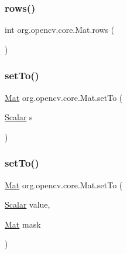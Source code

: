 \subsubsection{\texorpdfstring{rows()}{rows()}}
{\footnotesize\ttfamily int org.\+opencv.\+core.\+Mat.\+rows (\begin{DoxyParamCaption}{ }\end{DoxyParamCaption})}

\mbox{\label{classorg_1_1opencv_1_1core_1_1_mat_a9316a305061d8ef51b7e7355d5e7440d}} 
\subsubsection{\texorpdfstring{set\+To()}{setTo()}\hspace{0.1cm}{\footnotesize\ttfamily [1/4]}}
{\footnotesize\ttfamily \mbox{\hyperlink{classorg_1_1opencv_1_1core_1_1_mat}{Mat}} org.\+opencv.\+core.\+Mat.\+set\+To (\begin{DoxyParamCaption}\item[{\mbox{\hyperlink{classorg_1_1opencv_1_1core_1_1_scalar}{Scalar}}}]{s }\end{DoxyParamCaption})}

\mbox{\label{classorg_1_1opencv_1_1core_1_1_mat_a56d903b85bbe289ee484e1b22efa2a91}} 
\subsubsection{\texorpdfstring{set\+To()}{setTo()}\hspace{0.1cm}{\footnotesize\ttfamily [2/4]}}
{\footnotesize\ttfamily \mbox{\hyperlink{classorg_1_1opencv_1_1core_1_1_mat}{Mat}} org.\+opencv.\+core.\+Mat.\+set\+To (\begin{DoxyParamCaption}\item[{\mbox{\hyperlink{classorg_1_1opencv_1_1core_1_1_scalar}{Scalar}}}]{value,  }\item[{\mbox{\hyperlink{classorg_1_1opencv_1_1core_1_1_mat}{Mat}}}]{mask }\end{DoxyParamCaption})}

